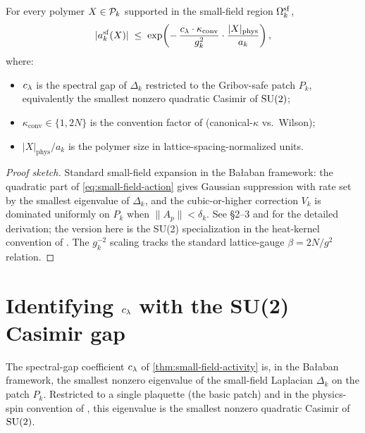 \begin{theorem}
\label{thm:small-field-activity}
For every polymer $X \in \mathcal{P}_k$ supported in the small-field
region $\Omega_k^{\mathrm{sf}}$,
\begin{equation}
  \label{eq:small-field-activity-bound}
  |a_k^{\mathrm{sf}}(X)|
  \;\le\;
  \exp\!\left(-\,\frac{c_\lambda \cdot \kappa_{\mathrm{conv}}}{g_k^2}
    \cdot \frac{|X|_{\mathrm{phys}}}{a_k}\right) ,
\end{equation}
where:
\begin{itemize}
  \item $c_\lambda$ is the spectral gap of $\Delta_k$ restricted to
    the Gribov-safe patch $P_k$, equivalently the smallest
    nonzero quadratic Casimir of $\mathrm{SU}(2)$;
  \item $\kappa_{\mathrm{conv}} \in \{1, 2N\}$ is the
    convention factor of 
    (canonical-$\kappa$ vs.\ Wilson);
  \item $|X|_{\mathrm{phys}} / a_k$ is the polymer size in
    lattice-spacing-normalized units.
\end{itemize}
\end{theorem}

\begin{proof}[Proof sketch]
Standard small-field expansion in the Bałaban framework: the
quadratic part of \eqref{eq:small-field-action} gives Gaussian
suppression with rate set by the smallest eigenvalue of $\Delta_k$,
and the cubic-or-higher correction $V_k$ is dominated uniformly on
$P_k$ when $\|A_p\| < \delta_k$.  See
\cite{Balaban1987RG-I} \S2--3 and \cite{Balaban1988RG-II} for the
detailed derivation; the version here is the SU(2) specialization
in the heat-kernel convention of .  The
$g_k^{-2}$ scaling tracks the standard lattice-gauge
$\beta = 2N/g^2$ relation.
\end{proof}

\section{Identifying \texorpdfstring{$c_\lambda$}{c\_lambda}
  with the SU(2) Casimir gap}
\label{sec:c-lambda-casimir}

%

The spectral-gap coefficient $c_\lambda$ of
\cref{thm:small-field-activity} is, in the Bałaban framework, the
smallest nonzero eigenvalue of the small-field Laplacian $\Delta_k$
on the patch $P_k$.  Restricted to a single plaquette (the
basic patch) and in the physics-spin convention of
, this eigenvalue is the smallest nonzero
quadratic Casimir of $\mathrm{SU}(2)$.

